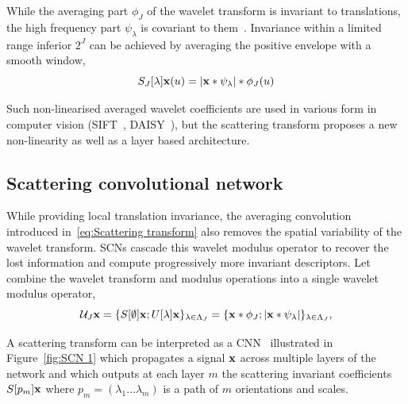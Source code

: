 \documentclass{article}
\begin{document}
    While the averaging part $\phi_{J}$ of the wavelet transform is invariant to translations, the high frequency part $\psi_{\lambda}$ is covariant to them~\cite{mallat2012gis}. Invariance within a limited range inferior $2^{J}$ can be achieved by averaging the positive envelope with a smooth window,
    \vspace{-5pt}
    \begin{equation}
      \label{eq:Scattering transform}
      S_{J}[\lambda]{\bf x}(u) = \left| {\bf x} \ast \psi_{\lambda} \right| \ast \phi_{J}(u)
    \end{equation}
    \vspace{-10pt}
    
    Such non-linearised averaged wavelet coefficients are used in various form in computer vision (SIFT~\cite{grabner2006fast}, DAISY~\cite{winder2009picking}), but the scattering transform proposes a new non-linearity as well as a layer based architecture.
  
  \vspace{-5pt}
  \subsection{Scattering convolutional network}
    \label{subsec:SCN/SCN}
    \vspace{-5pt}
    While providing local translation invariance, the averaging convolution introduced in~\ref{eq:Scattering transform} also removes the spatial variability of the wavelet transform. SCNs cascade this wavelet modulus operator to recover the lost information and compute progressively more invariant descriptors. Let combine the wavelet transform and modulus operations into a single wavelet modulus operator,
    \vspace{-5pt}
    \begin{equation}
      \mathcal{U}_{J} {\bf x} = \{ S[\emptyset] {\bf x} ; U[\lambda]{\bf x} \}_{\lambda \in \Lambda_{J}} 
          = \{ {\bf x} \ast \phi_{J}; \left| {\bf x} \ast \psi_{\lambda} \right| \}_{\lambda \in \Lambda_{J}},
      \label{eq:One step propagator}
    \end{equation}
    
    A scattering transform can be interpreted as a CNN~\cite{oyallon2014deep} illustrated in Figure~\ref{fig:SCN 1} which propagates a signal ${\bf x}$ across multiple layers of the network and which outputs at each layer $m$ the scattering invariant coefficients $S[p_{m}]{\bf x}$ where $p_{m}=(\lambda_{1} \dots \lambda_{m})$ is a path of $m$ orientations and scales.
    
\end{document}
